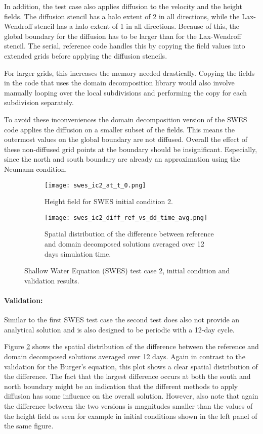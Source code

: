 In addition, the test case also applies diffusion to the velocity and the height fields.
The diffusion stencil has a halo extent of 2 in all directions, while the Lax-Wendroff stencil has a halo extent of 1 in all directions.
Because of this, the global boundary for the diffusion has to be larger than for the Lax-Wendroff stencil.
The serial, reference code handles this by copying the field values into extended grids before applying the diffusion stencils.

For larger grids, this increases the memory needed drastically.
Copying the fields in the code that uses the domain decomposition library would also involve manually looping over the local subdivisions and performing the copy for each subdivision separately.

To avoid these inconveniences the domain decomposition version of the SWES code applies the diffusion on a smaller subset of the fields.
This means the outermost values on the global boundary are not diffused.
Overall the effect of these non-diffused grid points at the boundary should be insignificant.
Especially, since the north and south boundary are already an approximation using the Neumann condition.

\begin{figure}[ht]
\begin{subfigure}[t]{.45\textwidth}
  \texttt{[image: swes\_ic2\_at\_t\_0.png]}
  \caption{Height field for SWES initial condition 2.}
  \label{fig:swes_ic2}
\end{subfigure} \hfill
\begin{subfigure}[t]{.45\textwidth}
  \texttt{[image: swes\_ic2\_diff\_ref\_vs\_dd\_time\_avg.png]}
  \caption{Spatial distribution of the difference between reference and domain decomposed solutions averaged over 12 days simulation time.}
  \label{fig:swes_ic2_diff}
\end{subfigure}
\caption{Shallow Water Equation (SWES) test case 2, initial condition and validation results.}
\label{fig:swes_ic2_graphs}
\end{figure}

\paragraph{Validation:}
Similar to the first SWES test case the second test does also not provide an analytical solution and is also designed to be periodic with a 12-day cycle.

Figure \ref{fig:swes_ic2_diff} shows the spatial distribution of the difference between the reference and domain decomposed solutions averaged over 12 days.
Again in contrast to the validation for the Burger's equation, this plot shows a clear spatial distribution of the difference.
The fact that the largest difference occurs at both the south and north boundary might be an indication that the different methods to apply diffusion has some influence on the overall solution.
However, also note that again the difference between the two versions is magnitudes smaller than the values of the height field as seen for example in initial conditions shown in the left panel of the same figure.


